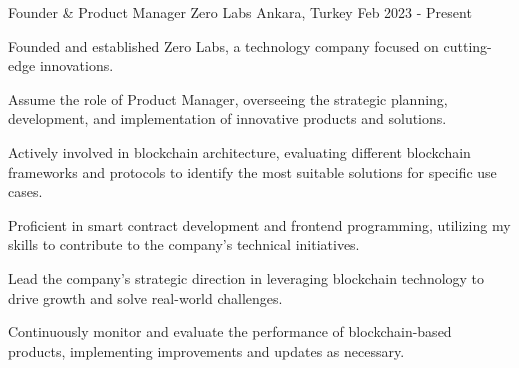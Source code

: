 

\begin{cventries}

  \cventry
    {Founder \& Product Manager} %
    {Zero Labs} %
    {Ankara, Turkey} %
    {Feb 2023 - Present} %
    {
      \begin{cvitems} %
        \item {Founded and established Zero Labs, a technology company focused on cutting-edge innovations.}
        \item {Assume the role of Product Manager, overseeing the strategic planning, development, and implementation of innovative products and solutions.}
        \item {Actively involved in blockchain architecture, evaluating different blockchain frameworks and protocols to identify the most suitable solutions for specific use cases.}
        \item {Proficient in smart contract development and frontend programming, utilizing my skills to contribute to the company's technical initiatives.}
        \item {Lead the company's strategic direction in leveraging blockchain technology to drive growth and solve real-world challenges.}
         \item {Continuously monitor and evaluate the performance of blockchain-based products, implementing improvements and updates as necessary.}
      \end{cvitems}
    } 
 

\end{cventries}
